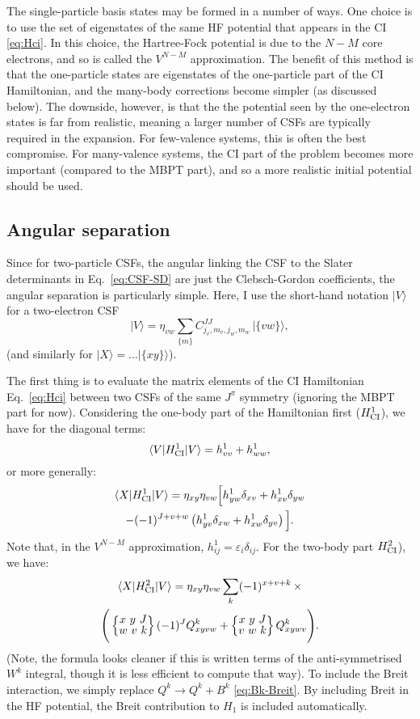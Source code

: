 \documentclass[10pt,twocolumn,a4paper]{article}%
\newcommand{\bra}[1]{\ensuremath{\langle #1|}}	%
\newcommand{\ket}[1]{\ensuremath{|#1\rangle}}
\newcommand{\sixjs}[6]{\renewcommand\arraystretch{0.75}\ensuremath{\begin{Bmatrix}#1~#2~#3\\#4~#5~#6\end{Bmatrix}}}	%
\newcommand{\be}{\begin{equation}}
\newcommand{\ee}{\end{equation}}
\def\en{\ensuremath{\varepsilon}}
\begin{document}
The single-particle basis states may be formed in a number of ways.
One choice is to use the set of eigenstates of the same HF potential that appears in the CI \eqref{eq:Hci}.
In this choice, the Hartree-Fock potential is due to the $N-M$ core electrons, and so is called the $V^{N-M}$ approximation.
The benefit of this method is that the one-particle states are eigenstates of the one-particle part of the CI Hamiltonian, and the many-body corrections become simpler (as discussed below).
The downside, however, is that the the potential seen by the one-electron states is far from realistic, meaning a larger number of CSFs are typically required in the expansion.
For few-valence systems, this is often the best compromise.
For many-valence systems, the CI part of the problem becomes more important (compared to the MBPT part), and so a more realistic initial potential should be used.


\subsection{Angular separation}

Since for two-particle CSFs, the angular linking the CSF to the Slater determinants in Eq.~\eqref{eq:CSF-SD} are just the Clebsch-Gordon coefficients, the angular separation is particularly simple.
Here, I use the short-hand notation $\ket{V}$ for a two-electron CSF
\be\label{eq:CSF-to-SD}
    \ket{V} = \eta_{vw} \sum_{\{m\}}
C^{JJ}_{j_v,m_v,j_w,m_w} \, 
    \ket{\{vw\}},
\ee
(and similarly for $\ket{X}= ...\ket{\{xy\}}$).

The first thing is to evaluate the matrix elements of the CI Hamiltonian Eq.~\eqref{eq:Hci} between two CSFs of the same $J^\pi$ symmetry (ignoring the MBPT part for now).
Considering the one-body part of the Hamiltonian first ($H_{\rm CI}^1$), we have for the diagonal terms:
\begin{equation}
    \bra{V} H_{\rm CI}^1 \ket{V}
    = h^1_{vv}+h^1_{ww},
\end{equation}
or more generally:
\begin{multline}
    \bra{X} H_{\rm CI}^1 \ket{V}
    = 
    \eta_{xy}\eta_{vw}\Big[
    h^1_{yw}\delta_{xv}
    +h^1_{xv}\delta_{yw}\\
    -(-1)^{J+v+w}\left(
        h^1_{yv}\delta_{xw}
        +h^1_{xw}\delta_{yv}
        \right)
    \Big].
\end{multline}
Note that, in the $V^{N-M}$ approximation,
$h^1_{ij} = \en_i\delta_{ij}$.
For the two-body part $H_{\rm CI}^2$), we have:
\begin{multline}
    \bra{X} H_{\rm CI}^2 \ket{V}
    = 
    \eta_{xy}\eta_{vw}\sum_k(-1)^{x+v+k}
    \,\times\\
    \Bigg(\sixjs{x}{y}{J}{w}{v}{k} (-1)^{J}Q^k_{xyvw}
    +
    \sixjs{x}{y}{J}{v}{w}{k}Q^k_{xywv}
    \Bigg).
\end{multline}
(Note, the formula looks cleaner if this is written terms of the anti-symmetrised $W^k$ integral, though it is less efficient to compute that way).
To include the Breit interaction, we simply replace $Q^k\to Q^k + B^k$ \eqref{eq:Bk-Breit}. 
By including Breit in the HF potential, the Breit contribution to $H_1$ is included automatically.
\end{document}
